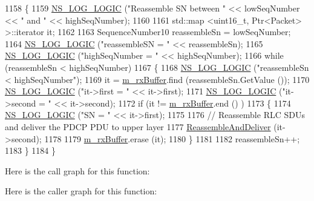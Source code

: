 \begin{DoxyCode}
1158 \{
1159   \hyperlink{group__logging_ga88acd260151caf2db9c0fc84997f45ce}{NS\_LOG\_LOGIC} (\textcolor{stringliteral}{"Reassemble SN between "} << lowSeqNumber << \textcolor{stringliteral}{" and "} << highSeqNumber);
1160 
1161   std::map <uint16\_t, Ptr<Packet> >::iterator it;
1162 
1163   SequenceNumber10 reassembleSn = lowSeqNumber;
1164   \hyperlink{group__logging_ga88acd260151caf2db9c0fc84997f45ce}{NS\_LOG\_LOGIC} (\textcolor{stringliteral}{"reassembleSN = "} << reassembleSn);
1165   \hyperlink{group__logging_ga88acd260151caf2db9c0fc84997f45ce}{NS\_LOG\_LOGIC} (\textcolor{stringliteral}{"highSeqNumber = "} << highSeqNumber);
1166   \textcolor{keywordflow}{while} (reassembleSn < highSeqNumber)
1167     \{
1168       \hyperlink{group__logging_ga88acd260151caf2db9c0fc84997f45ce}{NS\_LOG\_LOGIC} (\textcolor{stringliteral}{"reassembleSn < highSeqNumber"});
1169       it = \hyperlink{classns3_1_1LteRlcUm_aa4611282929afb798d591eafca1e6adb}{m\_rxBuffer}.find (reassembleSn.GetValue ());
1170       \hyperlink{group__logging_ga88acd260151caf2db9c0fc84997f45ce}{NS\_LOG\_LOGIC} (\textcolor{stringliteral}{"it->first  = "} << it->first);
1171       \hyperlink{group__logging_ga88acd260151caf2db9c0fc84997f45ce}{NS\_LOG\_LOGIC} (\textcolor{stringliteral}{"it->second = "} << it->second);
1172       \textcolor{keywordflow}{if} (it != \hyperlink{classns3_1_1LteRlcUm_aa4611282929afb798d591eafca1e6adb}{m\_rxBuffer}.end () )
1173         \{
1174           \hyperlink{group__logging_ga88acd260151caf2db9c0fc84997f45ce}{NS\_LOG\_LOGIC} (\textcolor{stringliteral}{"SN = "} << it->first);
1175 
1176           \textcolor{comment}{// Reassemble RLC SDUs and deliver the PDCP PDU to upper layer}
1177           \hyperlink{classns3_1_1LteRlcUm_a103ba1e3d14eb2604a44d1bef7fe7cb7}{ReassembleAndDeliver} (it->second);
1178 
1179           \hyperlink{classns3_1_1LteRlcUm_aa4611282929afb798d591eafca1e6adb}{m\_rxBuffer}.erase (it);
1180         \}
1181         
1182       reassembleSn++;
1183     \}
1184 \}
\end{DoxyCode}


Here is the call graph for this function\+:




Here is the caller graph for this function\+:


